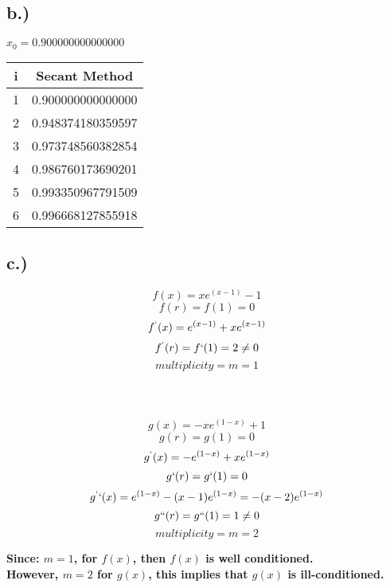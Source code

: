 \documentclass{article}
\begin{document}
\subsection*{b.)}
\textbf{$x_0 = 0.900000000000000$}
\begin{center}
    \begin{tabular}{||c c||}
    \hline
    \textbf{i} & \textbf{Secant Method} \\ [0.5ex]
    \hline\hline
    1 & 0.900000000000000 \\ [1ex]
    \hline
    2 & 0.948374180359597 \\ [1ex]
    \hline
    3 & 0.973748560382854 \\ [1ex]
    \hline
    4 & 0.986760173690201 \\ [1ex]
    \hline
    5 & 0.993350967791509 \\ [1ex]
    \hline
    6 & 0.996668127855918 \\ [1ex]
    \hline
    \end{tabular}
\end{center}
\pagebreak
\subsection*{c.)}

\[f(x) = xe^{(x-1)} - 1\] \[ f(r) = f(1) = 0\]
\[f^`(x) = e^{(x-1)} + xe^{(x-1)}\] \[f^`(r) = f`(1) = 2 \ne 0\]
\[multiplicity = m = 1 \]\\ \\ \\

\[g(x) = -xe^{(1-x)} + 1\] \[ g(r) = g(1) = 0\]
\[g^`(x) = -e^{(1-x)} + xe^{(1-x)}\] \[ g`(r) = g`(1) = 0\]
\[g^``(x) = e^{(1-x)} -(x-1)e^{(1-x)} = -(x-2)e^{(1-x)}\] \[g``(r) = g``(1) = 1 \ne 0\]
\[multiplicity = m = 2\]


\textbf{Since: $m = 1$, for $f(x)$, then $f(x)$ is well conditioned.\\ However, $m = 2$ for $g(x)$, this implies that $g(x)$ is ill-conditioned.}
\end{document}
